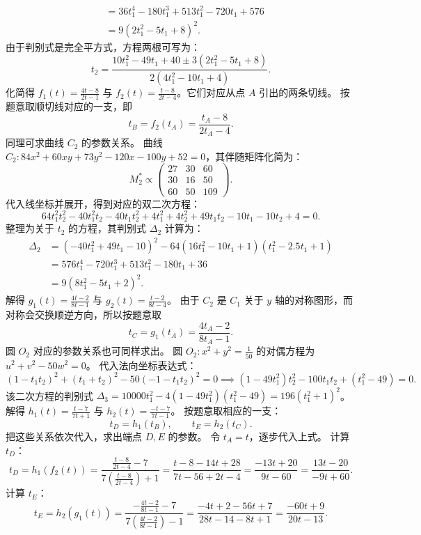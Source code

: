 \begin{solution}
\begin{align*}
&= 36 t_1^4 - 180 t_1^3 + 513 t_1^2 - 720 t_1 + 576 \\
&= 9(2 t_1^2 - 5 t_1 + 8)^2.
\end{align*}
由于判别式是完全平方式，方程两根可写为：
\[ t_2 = \frac{10 t_1^2 - 49 t_1 + 40 \pm 3(2 t_1^2 - 5 t_1 + 8)}{2(4 t_1^2 - 10 t_1 + 4)}. \]
化简得 $f_1(t) = \frac{4t - 8}{2t - 1}$ 与 $f_2(t) = \frac{t - 8}{2t - 4}$。它们对应从点 $A$ 引出的两条切线。
按题意取顺切线对应的一支，即
$$ t_B = f_2(t_A) = \frac{t_A - 8}{2t_A - 4}. $$
\noindent 同理可求曲线 $C_2$ 的参数关系。
曲线 $C_2: 84x^2 + 60xy + 73y^2 - 120x - 100y + 52 = 0$，其伴随矩阵化简为：
\[ M_2^* \propto \begin{pmatrix} 27 & 30 & 60 \\ 30 & 16 & 50 \\ 60 & 50 & 109 \end{pmatrix}. \]
代入线坐标并展开，得到对应的双二次方程：
\[ 64 t_1^2 t_2^2 - 40 t_1^2 t_2 - 40 t_1 t_2^2 + 4 t_1^2 + 4 t_2^2 + 49 t_1 t_2 - 10 t_1 - 10 t_2 + 4 = 0. \]
整理为关于 $t_2$ 的方程，其判别式 $\Delta_2$ 计算为：
\begin{align*}
\Delta_2 &= (-40 t_1^2 + 49 t_1 - 10)^2 - 64(16 t_1^2 - 10 t_1 + 1)(t_1^2 - 2.5 t_1 + 1) \\
&= 576 t_1^4 - 720 t_1^3 + 513 t_1^2 - 180 t_1 + 36 \\
&= 9(8 t_1^2 - 5 t_1 + 2)^2.
\end{align*}
解得 $g_1(t) = \frac{4t - 2}{8t - 1}$ 与 $g_2(t) = \frac{t - 2}{8t - 4}$。
由于 $C_2$ 是 $C_1$ 关于 $y$ 轴的对称图形，而对称会交换顺逆方向，所以按题意取
$$ t_C = g_1(t_A) = \frac{4t_A - 2}{8t_A - 1}. $$
\noindent 圆 $O_2$ 对应的参数关系也可同样求出。
圆 $O_2: x^2 + y^2 = \frac{1}{50}$ 的对偶方程为 $u^2 + v^2 - 50w^2 = 0$。
代入法向坐标表达式：
\[ (1 - t_1 t_2)^2 + (t_1 + t_2)^2 - 50(-1 - t_1 t_2)^2 = 0 \implies (1 - 49 t_1^2)t_2^2 - 100 t_1 t_2 + (t_1^2 - 49) = 0. \]
该二次方程的判别式 $\Delta_3 = 10000 t_1^2 - 4(1 - 49 t_1^2)(t_1^2 - 49) = 196(t_1^2 + 1)^2$。
解得 $h_1(t) = \frac{t - 7}{7t + 1}$ 与 $h_2(t) = \frac{-t - 7}{7t - 1}$。
按题意取相应的一支：
$$ t_D = h_1(t_B), \qquad t_E = h_2(t_C). $$
把这些关系依次代入，求出端点 $D, E$ 的参数。
令 $t_A = t$，逐步代入上式。
计算 $t_D$：
\[ t_D = h_1(f_2(t)) = \frac{\frac{t - 8}{2t - 4} - 7}{7 \left( \frac{t - 8}{2t - 4} \right) + 1} = \frac{t - 8 - 14t + 28}{7t - 56 + 2t - 4} = \frac{-13t + 20}{9t - 60} = \frac{13t - 20}{-9t + 60}. \]
计算 $t_E$：
\[ t_E = h_2(g_1(t)) = \frac{-\frac{4t - 2}{8t - 1} - 7}{7 \left( \frac{4t - 2}{8t - 1} \right) - 1} = \frac{-4t + 2 - 56t + 7}{28t - 14 - 8t + 1} = \frac{-60t + 9}{20t - 13}. \]

\end{solution}
